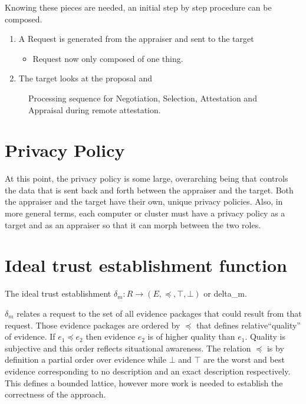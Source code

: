 \documentclass[10pt]{article}
\begin{document}
Knowing these pieces are needed, an initial step by step procedure can be composed.
\begin{enumerate}
\item A Request is generated from the appraiser and sent to the target
	\begin{itemize}
	\item Request now only composed of one thing.
	\end{itemize}
\item The target looks at the proposal and 
\end{enumerate} 

\begin{figure}[hbtp]
  \centering
  
  \caption[Attestation and Appraisal Sequence for One Request]{Processing sequence for
    Negotiation, Selection, Attestation and Appraisal during remote
    attestation.}
  \label{fig:att-app-seq}
\end{figure}

\section {Privacy Policy}

At this point, the privacy policy is some large, overarching being that controls the data that is sent back and forth between the appraiser and the target. Both the appraiser and the target have their own, unique privacy policies. Also, in more general terms, each computer or cluster must have a privacy policy as a target and as an appraiser so that it can morph between the two roles. 

\section {Ideal trust establishment function}

The ideal trust establishment $\delta_m:R\rightarrow
(E,\preceq,\top,\bot)$ or delta_m. 

$\delta_m$ relates a request to the set of all evidence packages that 
could result from that request.  Those evidence packages are ordered
by $\preceq$ that defines relative``quality'' of evidence.  If
$e_1\preceq e_2$ then evidence $e_2$ is of higher quality than $e_1$.
Quality is subjective and this order reflects situational awareness.
The relation $\preceq$ is by definition a partial order 
over evidence while $\bot$ and $\top$ are the worst and best evidence
corresponding to no description and an exact description
respectively.  This defines a bounded lattice, however more work is
needed to establish the correctness of the approach.
\end{document}
